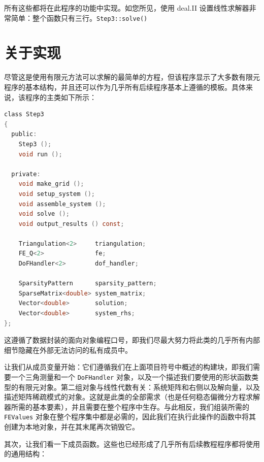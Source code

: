 \documentclass[12pt, a4paper]{article}
\numberwithin{equation}{section} %
\begin{document}
所有这些都将在此程序的功能中实现。如您所见，使用 deal.II 设置线性求解器非常简单：整个函数只有三行。\verb|Step3::solve()|


\newpage
\section{关于实现}
尽管这是使用有限元方法可以求解的最简单的方程，但该程序显示了大多数有限元程序的基本结构，并且还可以作为几乎所有后续程序基本上遵循的模板。具体来说，该程序的主类如下所示：

\begin{lstlisting}[language=c]
class Step3
{
  public:
    Step3 ();
    void run ();
 
  private:
    void make_grid ();
    void setup_system ();
    void assemble_system ();
    void solve ();
    void output_results () const;
 
    Triangulation<2>     triangulation;
    FE_Q<2>              fe;
    DoFHandler<2>        dof_handler;
 
    SparsityPattern      sparsity_pattern;
    SparseMatrix<double> system_matrix;
    Vector<double>       solution;
    Vector<double>       system_rhs;
};
\end{lstlisting}

这遵循了数据封装的面向对象编程口号，即我们尽最大努力将此类的几乎所有内部细节隐藏在外部无法访问的私有成员中。

让我们从成员变量开始：它们遵循我们在上面项目符号中概述的构建块，即我们需要一个三角测量和一个 \verb|DoFHandler| 对象，以及一个描述我们要使用的形状函数类型的有限元对象。第二组对象与线性代数有关：系统矩阵和右侧以及解向量，以及描述矩阵稀疏模式的对象。这就是此类的全部需求（也是任何稳态偏微分方程求解器所需的基本要素），并且需要在整个程序中生存。与此相反，我们组装所需的\verb|FEValues| 对象在整个程序集中都是必需的，因此我们在执行此操作的函数中将其创建为本地对象，并在其末尾再次销毁它。

其次，让我们看一下成员函数。这些也已经形成了几乎所有后续教程程序都将使用的通用结构：
\end{document}
